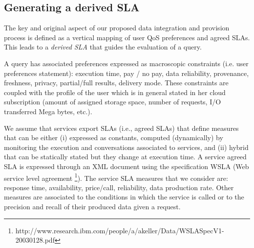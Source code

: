 \subsection{Generating a derived SLA}
\label{sec:slaModel}
The key and original aspect of   our proposed data integration and provision process is  defined as a vertical mapping of user QoS preferences and agreed SLAs. This  leads to a {\em derived SLA} that guides the evaluation of a query. 

A query has associated preferences  expressed as macroscopic constraints (i.e. user preferences statement): execution time, pay / no pay, data reliability, provenance, freshness, privacy, partial/full results, delivery mode. These constraints are coupled with the profile of the user which is in general stated in her cloud subscription (amount of assigned storage space, number of requests, I/O transferred Mega bytes, etc.). 




We assume that services export SLAs (i.e., agreed SLAs) that define measures   that can be either (i) expressed as constants,  computed (dynamically) by monitoring the execution and conversations associated to services, and (ii) hybrid that can be statically stated  but they change at execution time.  A service  agreed SLA is expressed through an  XML document using the specification WSLA (Web service level agreement \footnote{\footnotesize http://www.research.ibm.com/people/a/akeller/\-Data/WSLASpecV1-20030128.pdf}). The service SLA measures  that we consider are: response time, availability, price/call, reliability, data production rate. Other measures are associated to the conditions in which the service is called or to the precision and recall of their produced data given a request. 


